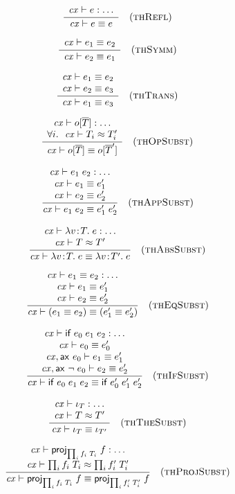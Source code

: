 
\[
\frac{\begin{array}{c}\mathit{cx}\vdash e:\ldots\end{array}}{\mathit{cx}\vdash e\equiv e}\quad\mbox{(\textsc{thRefl})}
\]

\[
\frac{\begin{array}{c}\mathit{cx}\vdash e_1\equiv e_2\end{array}}{\mathit{cx}\vdash e_2\equiv e_1}\quad\mbox{(\textsc{thSymm})}
\]

\[
\frac{\begin{array}{c}\mathit{cx}\vdash e_1\equiv e_2\\\mathit{cx}\vdash e_2\equiv e_3\end{array}}{\mathit{cx}\vdash e_1\equiv e_3}\quad\mbox{(\textsc{thTrans})}
\]

\[
\frac{\begin{array}{c}\mathit{cx}\vdash o[\overline{T}]:\ldots\\\forall i.\ \ \mathit{cx}\vdash T_i\approx T_i'\end{array}}{\mathit{cx}\vdash o[\overline{T}]\equiv o[\overline{T}']}\quad\mbox{(\textsc{thOpSubst})}
\]

\[
\frac{\begin{array}{c}\mathit{cx}\vdash e_1\;e_2:\ldots\\\mathit{cx}\vdash e_1\equiv e_1'\\\mathit{cx}\vdash e_2\equiv e_2'\end{array}}{\mathit{cx}\vdash e_1\;e_2\equiv e_1'\;e_2'}\quad\mbox{(\textsc{thAppSubst})}
\]

\[
\frac{\begin{array}{c}\mathit{cx}\vdash\lambda v\!:\!T.\;e:\ldots\\\mathit{cx}\vdash T\approx T'\end{array}}{\mathit{cx}\vdash\lambda v\!:\!T.\;e\equiv\lambda v\!:\!T'.\;e}\quad\mbox{(\textsc{thAbsSubst})}
\]

\[
\frac{\begin{array}{c}\mathit{cx}\vdash e_1\equiv e_2:\ldots\\\mathit{cx}\vdash e_1\equiv e_1'\\\mathit{cx}\vdash e_2\equiv e_2'\end{array}}{\mathit{cx}\vdash(e_1\equiv e_2)\equiv(e_1'\equiv e_2')}\quad\mbox{(\textsc{thEqSubst})}
\]

\[
\frac{\begin{array}{c}\mathit{cx}\vdash\mathsf{if}\;e_0\;e_1\;e_2:\ldots\\\mathit{cx}\vdash e_0\equiv e_0'\\\mathit{cx},\mathsf{ax}\ e_0\vdash e_1\equiv e_1'\\\mathit{cx},\mathsf{ax}\ \neg\;e_0\vdash e_2\equiv e_2'\end{array}}{\mathit{cx}\vdash\mathsf{if}\;e_0\;e_1\;e_2\equiv\mathsf{if}\;e_0'\;e_1'\;e_2'}\quad\mbox{(\textsc{thIfSubst})}
\]

\[
\frac{\begin{array}{c}\mathit{cx}\vdash\iota_{T}:\ldots\\\mathit{cx}\vdash T\approx T'\end{array}}{\mathit{cx}\vdash\iota_{T}\equiv\iota_{T'}}\quad\mbox{(\textsc{thTheSubst})}
\]

\[
\frac{\begin{array}{c}\mathit{cx}\vdash\mathsf{proj}_{\prod_{i}f_i\;T_i}\;{f}:\ldots\\\mathit{cx}\vdash\prod_{i}f_i\;T_i\approx\prod_{i}f_i'\;T_i'\end{array}}{\mathit{cx}\vdash\mathsf{proj}_{\prod_{i}f_i\;T_i}\;{f}\equiv\mathsf{proj}_{\prod_{i}f_i'\;T_i'}\;{f}}\quad\mbox{(\textsc{thProjSubst})}
\]




